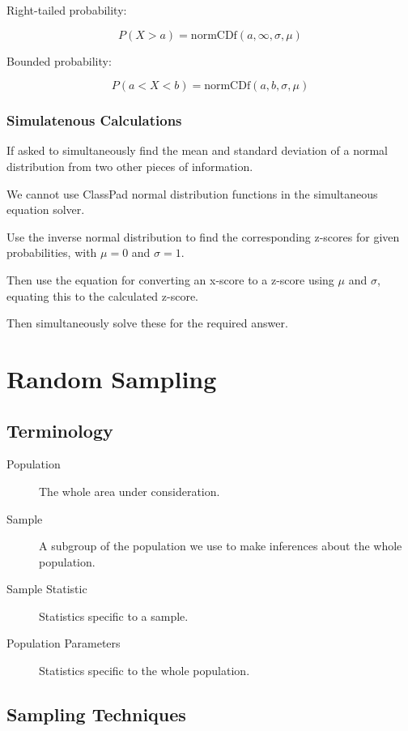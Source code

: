 \documentclass[a4paper,11pt]{article}
\begin{document}
Right-tailed probability:

$$
P(X > a) = \text{normCDf}(a, \infty, \sigma, \mu)
$$

Bounded probability:

$$
P(a < X < b) = \text{normCDf}(a, b, \sigma, \mu)
$$


\subsubsection{Simulatenous Calculations}

If asked to simultaneously find the mean and standard deviation of a normal
distribution from two other pieces of information.

We cannot use ClassPad normal distribution functions in the simultaneous
equation solver.

Use the inverse normal distribution to find the corresponding z-scores for
given probabilities, with $\mu = 0$ and $\sigma = 1$.

Then use the equation for converting an x-score to a z-score using $\mu$ and
$\sigma$, equating this to the calculated z-score.

Then simultaneously solve these for the required answer.



\section{Random Sampling}

\subsection{Terminology}

\begin{description}
\item [Population] The whole area under consideration.
\item [Sample] A subgroup of the population we use to make inferences about the
	whole population.
\item [Sample Statistic] Statistics specific to a sample.
\item [Population Parameters] Statistics specific to the whole population.
\end{description}

\subsection{Sampling Techniques}
\end{document}
